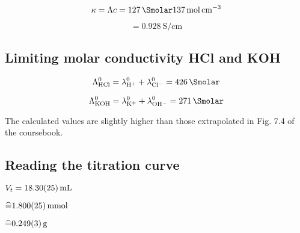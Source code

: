 $$\kappa = \Lambda c = \qty{127}{\Smolar}\qty{137}{\mole\per\centi\meter\cubed}$$

$$= \qty{0.928}{\siemens\per\centi\meter}$$



\subsection{Limiting molar conductivity HCl and KOH}

$$\Lambda^0_{\mathrm{HCl}} = \lambda_{\mathrm{H^+}}^0 + \lambda_{\mathrm{Cl^-}}^0 = \qty{426}{\Smolar}$$

$$\Lambda^0_{\mathrm{KOH}} = \lambda_{\mathrm{K^+}}^0 + \lambda_{\mathrm{OH^-}}^0 = \qty{271}{\Smolar}$$

The calculated values are slightly higher than those extrapolated in Fig. 7.4 of the coursebook. 




\subsection{Reading the titration curve}

$V_t = \qty{18.30 \pm 0.25}{\milli\liter}$

$\widehat{=} \qty{1.800 \pm 0.025}{\milli\mole}$

$\widehat{=} \qty{0.249 \pm 0.003}{\gram}$

